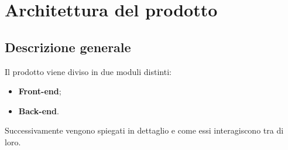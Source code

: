 \section{Architettura del prodotto}

\subsection{Descrizione generale}

Il prodotto viene diviso in due moduli distinti:
\begin{itemize}
\item \textbf{Front-end};
\item \textbf{Back-end}.
\end{itemize}

Successivamente vengono spiegati in dettaglio e come essi interagiscono tra di loro.



\newpage



